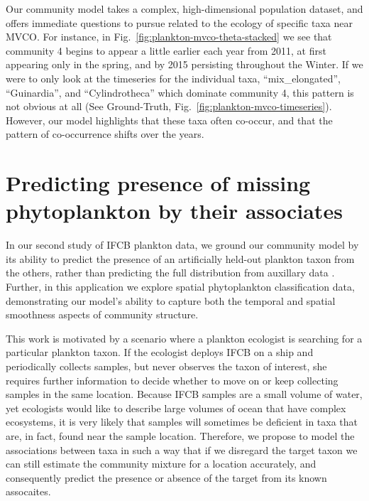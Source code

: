 Our community model takes a complex, high-dimensional population dataset, and offers immediate questions to pursue related to the ecology of specific taxa near MVCO. For instance, in Fig.~\ref{fig:plankton-mvco-theta-stacked} we see that community 4 begins to appear a little earlier each year from 2011, at first appearing only in the spring, and by 2015 persisting throughout the Winter. If we were to only look at the timeseries for the individual taxa, ``mix\_elongated'', ``Guinardia'', and ``Cylindrotheca'' which dominate community 4, this pattern is not obvious at all (See Ground-Truth, Fig.~\ref{fig:plankton-mvco-timeseries}). However, our model highlights that these taxa often co-occur, and that the pattern of co-occurrence shifts over the years.

\section{Predicting presence of missing phytoplankton by their associates} \label{sec:plankton-spatial-search}
In our second study of IFCB plankton data, we ground our community model by its ability to predict the presence of an artificially held-out plankton taxon from the others, rather than predicting the full distribution from auxillary data \citep{Kalmbach2017a}. Further, in this application we explore spatial phytoplankton classification data, demonstrating our model's ability to capture both the temporal and spatial smoothness aspects of community structure.

This work is motivated by a scenario where a plankton ecologist is searching for a particular plankton taxon. If the ecologist deploys IFCB on a ship and periodically collects samples, but never observes the taxon of interest, she requires further information to decide whether to move on or keep collecting samples in the same location. Because IFCB samples are a small volume of water, yet ecologists would like to describe large volumes of ocean that have complex ecosystems, it is very likely that samples will sometimes be deficient in taxa that are, in fact, found near the sample location. Therefore, we propose to model the associations between taxa in such a way that if we disregard the target taxon we can still estimate the community mixture for a location accurately, and consequently predict the presence or absence of the target from its known assocaites.

